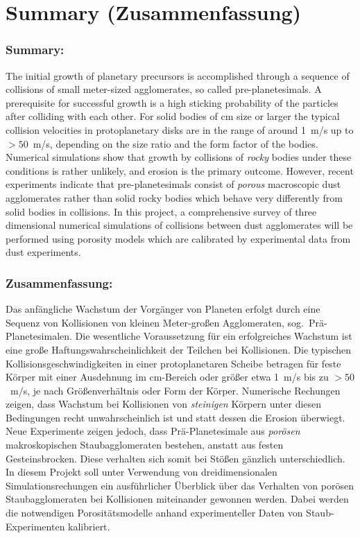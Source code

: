 \section{Summary (Zusammenfassung)}
%
\subsubsection{Summary:}
%
The initial growth of planetary precursors is accomplished through a
sequence of collisions of small meter-sized agglomerates, so called
pre-planetesimals.  A prerequisite for successful growth is a high sticking
probability of the particles after colliding with each other.  For solid
bodies of cm size or larger the typical collision velocities in
protoplanetary disks are in the range of around 1~m/s up to $>50$~m/s,
depending on the size ratio and the form factor of the bodies. Numerical
simulations show that growth by collisions of {\it rocky} bodies under these
conditions is rather unlikely, and erosion is the primary outcome.  However,
recent experiments indicate that pre-planetesimals consist of {\it porous}
macroscopic dust agglomerates rather than solid rocky bodies which behave
very differently from solid bodies in collisions.  In this project, a
comprehensive survey of three dimensional numerical simulations of
collisions between dust agglomerates will be performed using porosity models
which are calibrated by experimental data from dust experiments.
%
\subsubsection{Zusammenfassung:}
Das anf\"angliche Wachstum der Vorg\"anger von Planeten erfolgt durch eine
Sequenz von Kollisionen von kleinen Meter-gro{\ss}en Agglomeraten, sog.\
Pr\"a-Planetesimalen.  Die wesentliche Voraussetzung f\"ur ein erfolgreiches
Wachstum ist eine gro{\ss}e Haftungswahrscheinlichkeit der Teilchen bei
Kollisionen.  Die typischen Kollisionsgeschwindigkeiten in einer
protoplanetaren Scheibe betragen f\"ur feste K\"orper mit einer Ausdehnung
im cm-Bereich oder gr\"o{\ss}er etwa 1~m/s bis zu $>50$~m/s, je nach
Gr\"o{\ss}enverh\"altnis oder Form der K\"orper.  Numerische Rechungen
zeigen, dass Wachstum bei Kollisionen von {\it steinigen} K\"orpern unter
diesen Bedingungen recht unwahrscheinlich ist und statt dessen die Erosion
\"uberwiegt. Neue Experimente zeigen jedoch, dass Pr\"a-Planetesimale 
aus {\it por\"osen} makroskopischen Staubagglomeraten bestehen, anstatt aus
festen Gesteinsbrocken.  Diese verhalten sich somit bei St\"o{\ss}en
g\"anzlich unterschiedlich.  In diesem Projekt soll unter Verwendung von
dreidimensionalen Simulations\-rechungen ein ausf\"uhrlicher \"Uberblick
\"uber das Verhalten von por\"osen Staubagglomeraten bei Kollisionen
miteinander gewonnen werden.  Dabei werden die notwendigen
Porosit\"atsmodelle anhand experimenteller Daten von Staub-Experimenten
kalibriert.
%
